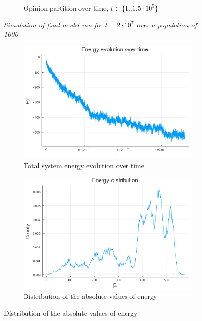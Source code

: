 \documentclass[12pt,openright,twoside]{book}
\begin{document}
\begin{appendices}
\begin{figure}
\begin{subfigure}[b]{0.65\linewidth}
    \caption{Opinion partition over time, $t \in \{1..1.5\cdot 10^5\}$}
\end{subfigure}
\caption{\textit{{\small Simulation of final model ran for $t=2\cdot 10^7$ over a population of 1000}}}
\label{pop1000}
\end{figure}

\begin{figure}[!htb]
\centering
\begin{subfigure}[b]{0.65\linewidth}
    \includegraphics[width=\linewidth]{figures/2_2/energy_evolution.png}
    \caption{Total system energy evolution over time}
\end{subfigure}
\begin{subfigure}[b]{0.65\linewidth}
    \includegraphics[width=\linewidth]{figures/2_2/energy_distribution.png}
    \caption{Distribution of the absolute values of energy}
\end{subfigure}

\end{figure}
\end{appendices}
\end{document}
